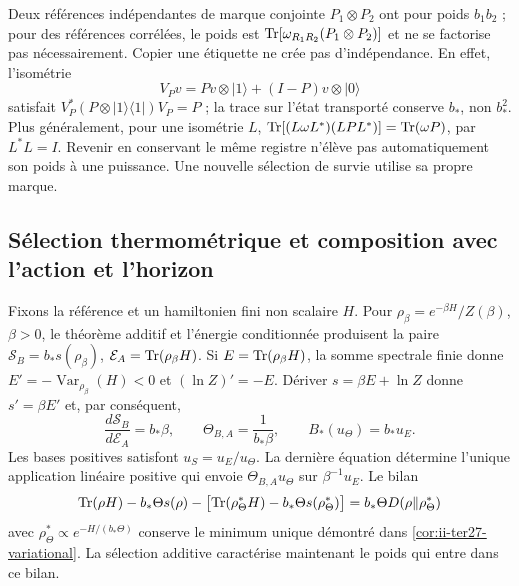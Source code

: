 Deux références indépendantes de marque conjointe $P_1\otimes P_2$
ont pour poids $b_1b_2$ ; pour des références corrélées, le poids est
$\operatorname{Tr}[\omega_{R_1R_2}(P_1\otimes P_2)]$ et ne se factorise pas nécessairement.
Copier une étiquette ne crée pas d’indépendance. En effet, l’isométrie
\[
 V_Pv=Pv\otimes|1\rangle+(I-P)v\otimes|0\rangle
\]
satisfait $V_P^*(P\otimes|1\rangle\langle1|)V_P=P$ ; la trace sur
l’état transporté conserve $b_*$, non $b_*^2$. Plus généralement,
pour une isométrie $L$,
$\operatorname{Tr}[(L\omega L^*)(LPL^*)]=\operatorname{Tr}(\omega P)$, par $L^*L=I$.
Revenir en conservant le même registre n’élève pas automatiquement son poids
à une puissance. Une nouvelle sélection de survie utilise sa propre marque.

\subsection{Sélection thermométrique et composition avec l’action et l’horizon}
\label{subsec:ii-tins-seleccion}

Fixons la référence et un hamiltonien fini non scalaire $H$. Pour
$\rho_\beta=e^{-\beta H}/Z(\beta)$, $\beta>0$, le théorème additif et
l’énergie conditionnée produisent la paire
$\mathcal S_B=b_*s(\rho_\beta)$, $\mathcal E_A=\operatorname{Tr}(\rho_\beta H)$.
Si $E=\operatorname{Tr}(\rho_\beta H)$, la somme spectrale finie donne
$E'=-\operatorname{Var}_{\rho_\beta}(H)<0$ et
$(\ln Z)'=-E$. Dériver $s=\beta E+\ln Z$ donne $s'=\beta E'$ et, par conséquent,
\begin{equation}
 \frac{d\mathcal S_B}{d\mathcal E_A}=b_*\beta,\qquad
 \Theta_{B,A}=\frac1{b_*\beta},\qquad B_*(u_\Theta)=b_*u_E.
 \label{eq:ii-tins-temperature}
\end{equation}
Les bases positives satisfont $u_S=u_E/u_\Theta$. La dernière équation
détermine l’unique application linéaire positive qui envoie
$\Theta_{B,A}u_\Theta$ sur $\beta^{-1}u_E$. Le bilan
\[
 \operatorname{Tr}(\rho H)-b_*\Theta s(\rho)-
 \bigl[\operatorname{Tr}(\rho_\Theta^*H)-b_*\Theta s(\rho_\Theta^*)\bigr]
 =b_*\Theta D(\rho\Vert\rho_\Theta^*)
\]
avec $\rho_\Theta^*\propto e^{-H/(b_*\Theta)}$ conserve le minimum
unique démontré dans \ref{cor:ii-ter27-variational}. La sélection additive
caractérise maintenant le poids qui entre dans ce bilan.

